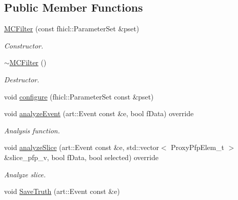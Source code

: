 \subsection*{Public Member Functions}
\begin{DoxyCompactItemize}
\item 
\hyperlink{classanalysis_1_1MCFilter_a4674d0a8c4bb203b107cbf33b132cf4e}{M\+C\+Filter} (const fhicl\+::\+Parameter\+Set \&pset)
\begin{DoxyCompactList}\small\item\em Constructor. \end{DoxyCompactList}\item 
\hyperlink{classanalysis_1_1MCFilter_a29c1e440a007d89982d765b100a02098}{$\sim$\+M\+C\+Filter} ()\hypertarget{classanalysis_1_1MCFilter_a29c1e440a007d89982d765b100a02098}{}\label{classanalysis_1_1MCFilter_a29c1e440a007d89982d765b100a02098}

\begin{DoxyCompactList}\small\item\em Destructor. \end{DoxyCompactList}\item 
void \hyperlink{classanalysis_1_1MCFilter_af59bef8a2a10217dd9e5dd5ef68e7b40}{configure} (fhicl\+::\+Parameter\+Set const \&pset)
\item 
void \hyperlink{classanalysis_1_1MCFilter_a4333e02179125d550675c38666b6dd43}{analyze\+Event} (art\+::\+Event const \&e, bool f\+Data) override
\begin{DoxyCompactList}\small\item\em Analysis function. \end{DoxyCompactList}\item 
void \hyperlink{classanalysis_1_1MCFilter_a35bda3e9965c91f64de0dd8805511b63}{analyze\+Slice} (art\+::\+Event const \&e, std\+::vector$<$ Proxy\+Pfp\+Elem\+\_\+t $>$ \&slice\+\_\+pfp\+\_\+v, bool f\+Data, bool selected) override\hypertarget{classanalysis_1_1MCFilter_a35bda3e9965c91f64de0dd8805511b63}{}\label{classanalysis_1_1MCFilter_a35bda3e9965c91f64de0dd8805511b63}

\begin{DoxyCompactList}\small\item\em Analyze slice. \end{DoxyCompactList}\item 
void \hyperlink{classanalysis_1_1MCFilter_a234a91a218b34d4c5d9b2599e9cba6cf}{Save\+Truth} (art\+::\+Event const \&e)\hypertarget{classanalysis_1_1MCFilter_a234a91a218b34d4c5d9b2599e9cba6cf}{}\label{classanalysis_1_1MCFilter_a234a91a218b34d4c5d9b2599e9cba6cf}


\end{DoxyCompactItemize}
